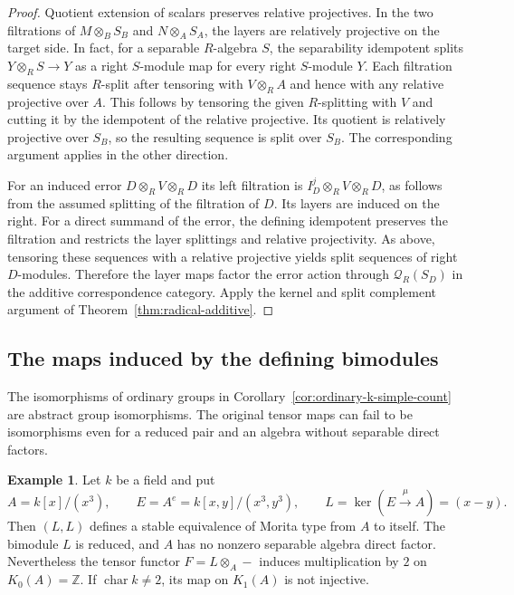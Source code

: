 \documentclass[12pt,a4paper,english,reqno]{amsart}
\numberwithin{equation}{section}
\theoremstyle{plain}
\theoremstyle{definition}
\newtheorem{example}[theorem]{Example}
\begin{document}
\begin{proof}
Quotient extension of scalars preserves relative projectives.
In the two filtrations of $M\otimes_B S_B$ and
$N\otimes_A S_A$, the layers are relatively projective on
the target side. In fact, for a separable $R$-algebra
$S$, the separability idempotent splits
$Y\otimes_R S\to Y$ as a right $S$-module map for every
right $S$-module $Y$. Each filtration sequence stays
$R$-split after tensoring with $V\otimes_R A$ and hence
with any relative projective over $A$. This follows by
tensoring the given $R$-splitting with $V$ and cutting
it by the idempotent of the relative projective. Its
quotient is relatively projective over $S_B$, so the
resulting sequence is split over $S_B$. The corresponding
argument applies in the other direction.

For an induced error $D\otimes_R V\otimes_R D$ its left
filtration is $I_D^j\otimes_R V\otimes_R D$, as follows
from the assumed splitting of the filtration of $D$.
Its layers are induced on the right. For a direct
summand of the error, the defining idempotent preserves
the filtration and restricts the layer splittings and
relative projectivity. As above, tensoring these sequences
with a relative projective yields split sequences of
right $D$-modules. Therefore the layer maps factor the
error action through $\mathcal Q_R(S_D)$ in the additive
correspondence category. Apply the kernel and split
complement argument of Theorem~\ref{thm:radical-additive}.
\end{proof}

\subsection{The maps induced by the defining bimodules}

The isomorphisms of ordinary groups in
Corollary~\ref{cor:ordinary-k-simple-count} are abstract group
isomorphisms. The original tensor maps can fail to be isomorphisms
even for a reduced pair and an algebra without separable direct
factors.

\begin{example}\label{ex:k-tensor-syzygy}
Let $k$ be a field and put
\[
 A=k[x]/(x^3),\qquad E=A^e=k[x,y]/(x^3,y^3),\qquad
 L=\ker(E\xrightarrow{\mu}A)=(x-y).
\]
Then $(L,L)$ defines a stable equivalence of Morita type from $A$
to itself. The bimodule $L$ is reduced, and $A$ has no nonzero
separable algebra direct factor. Nevertheless the tensor functor
$F=L\otimes_A-$ induces multiplication by $2$ on $K_0(A)=\mathbb Z$.
If $\operatorname{char}k\ne2$, its map on $K_1(A)$ is not injective.
\end{example}
\end{document}
